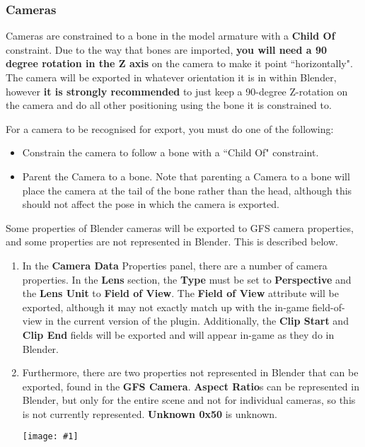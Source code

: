 \documentclass{article}
\newenvironment{guide}[1]
{
	\begin{center}
		\begin{tcolorbox}[%
			colback=black!20, 
			boxrule=0pt, 
			title=Step-by-step: #1,
			enhanced,
			breakable,
			overlay unbroken={%
                \draw[line width=1pt, black, rounded corners]
        	    (frame.north west) rectangle (frame.south east);
			},
    		overlay first={%
        		 \draw[line width=1pt, black, rounded corners]
        	    (frame.south west) -- (frame.north west) -- (frame.north east) -- (frame.south east);
                \draw[line width=1pt, black]
                (frame.south west) -- (frame.south east);
            },
    		overlay middle={%
                \draw[line width=1pt, black]
        	    (frame.north west) rectangle (frame.south east);
        	},
    		overlay last={%
                \draw[line width=1pt, black, rounded corners]
        	    (frame.north west) -- (frame.south west) -- (frame.south east) -- (frame.north east);
                \draw[line width=1pt, black]
                (frame.north west) -- (frame.north east);
           	}
        ]{}
    	\begin{enumerate}
}
{
    		\end{enumerate}
    	\end{tcolorbox}
	\end{center}  	 
}
\newcommand{\guideimage}[1]
{
	\begin{center}
		\texttt{[image: \#1]}
	\end{center}
}
\begin{document}
\subsubsection{Cameras}
Cameras are constrained to a bone in the model armature with a \textbf{Child Of} constraint. Due to the way that bones are imported, \textbf{you will need a 90 degree rotation in the Z axis} on the camera to make it point ``horizontally". The camera will be exported in whatever orientation it is in within Blender, however \textbf{it is strongly recommended} to just keep a 90-degree Z-rotation on the camera and do all other positioning using the bone it is constrained to.

For a camera to be recognised for export, you must do one of the following:
\begin{itemize}
\item Constrain the camera to follow a bone with a ``Child Of" constraint.
\item Parent the Camera to a bone. Note that parenting a Camera to a bone will place the camera at the tail of the bone rather than the head, although this should not affect the pose in which the camera is exported.
\end{itemize}

Some properties of Blender cameras will be exported to GFS camera properties, and some properties are not represented in Blender. This is described below.
\begin{guide}{Accessing Camera Properties}
\item In the \textbf{Camera Data} Properties panel, there are a number of camera properties. In the \textbf{Lens} section, the \textbf{Type} must be set to \textbf{Perspective} and the \textbf{Lens Unit} to \textbf{Field of View}. The \textbf{Field of View} attribute will be exported, although it may not exactly match up with the in-game field-of-view in the current version of the plugin. Additionally, the \textbf{Clip Start} and \textbf{Clip End} fields will be exported and will appear in-game as they do in Blender.
\item Furthermore, there are two properties not represented in Blender that can be exported, found in the \textbf{GFS Camera}. \textbf{Aspect Ratio}s can be represented in Blender, but only for the entire scene and not for individual cameras, so this is not currently represented. \textbf{Unknown 0x50} is unknown.
\guideimage{images/editing_models/edits_camera_properties.png}
\end{guide}
\end{document}
